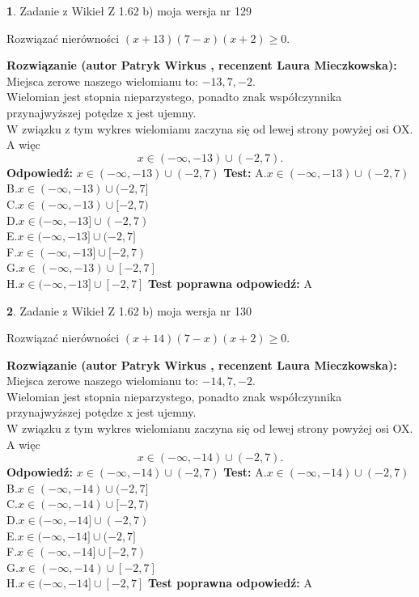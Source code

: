 \documentclass[12pt, a4paper]{article}
\theoremstyle{definition} %
\newtheorem{zad}{}
\newcommand{\zadStart}[1]{\begin{zad}#1\newline}
\newcommand{\zadStop}{\end{zad}}
\newcommand{\rozwStart}[2]{\noindent \textbf{Rozwiązanie (autor #1 , recenzent #2): }\newline}
\newcommand{\rozwStop}{\newline}
\newcommand{\odpStart}{\noindent \textbf{Odpowiedź:}\newline}
\newcommand{\odpStop}{\newline}
\newcommand{\testStart}{\noindent \textbf{Test:}\newline}
\newcommand{\testStop}{\newline}
\newcommand{\kluczStart}{\noindent \textbf{Test poprawna odpowiedź:}\newline}
\newcommand{\kluczStop}{\newline}
\begin{document}
\zadStart{Zadanie z Wikieł Z 1.62 b) moja wersja nr 129}

Rozwiązać nierówności $(x+13)(7-x)(x+2)\ge0$.
\zadStop
\rozwStart{Patryk Wirkus}{Laura Mieczkowska}
Miejsca zerowe naszego wielomianu to: $-13, 7, -2$.\\
Wielomian jest stopnia nieparzystego, ponadto znak współczynnika przy\linebreak najwyższej potędze x jest ujemny.\\ W związku z tym wykres wielomianu zaczyna się od lewej strony powyżej osi OX. A więc $$x \in (-\infty,-13) \cup (-2,7).$$
\rozwStop
\odpStart
$x \in (-\infty,-13) \cup (-2,7)$
\odpStop
\testStart
A.$x \in (-\infty,-13) \cup (-2,7)$\\
B.$x \in (-\infty,-13) \cup (-2,7]$\\
C.$x \in (-\infty,-13) \cup [-2,7)$\\
D.$x \in (-\infty,-13] \cup (-2,7)$\\
E.$x \in (-\infty,-13] \cup (-2,7]$\\
F.$x \in (-\infty,-13] \cup [-2,7)$\\
G.$x \in (-\infty,-13) \cup [-2,7]$\\
H.$x \in (-\infty,-13] \cup [-2,7]$
\testStop
\kluczStart
A
\kluczStop



\zadStart{Zadanie z Wikieł Z 1.62 b) moja wersja nr 130}

Rozwiązać nierówności $(x+14)(7-x)(x+2)\ge0$.
\zadStop
\rozwStart{Patryk Wirkus}{Laura Mieczkowska}
Miejsca zerowe naszego wielomianu to: $-14, 7, -2$.\\
Wielomian jest stopnia nieparzystego, ponadto znak współczynnika przy\linebreak najwyższej potędze x jest ujemny.\\ W związku z tym wykres wielomianu zaczyna się od lewej strony powyżej osi OX. A więc $$x \in (-\infty,-14) \cup (-2,7).$$
\rozwStop
\odpStart
$x \in (-\infty,-14) \cup (-2,7)$
\odpStop
\testStart
A.$x \in (-\infty,-14) \cup (-2,7)$\\
B.$x \in (-\infty,-14) \cup (-2,7]$\\
C.$x \in (-\infty,-14) \cup [-2,7)$\\
D.$x \in (-\infty,-14] \cup (-2,7)$\\
E.$x \in (-\infty,-14] \cup (-2,7]$\\
F.$x \in (-\infty,-14] \cup [-2,7)$\\
G.$x \in (-\infty,-14) \cup [-2,7]$\\
H.$x \in (-\infty,-14] \cup [-2,7]$
\testStop
\kluczStart
A
\kluczStop
\end{document}
